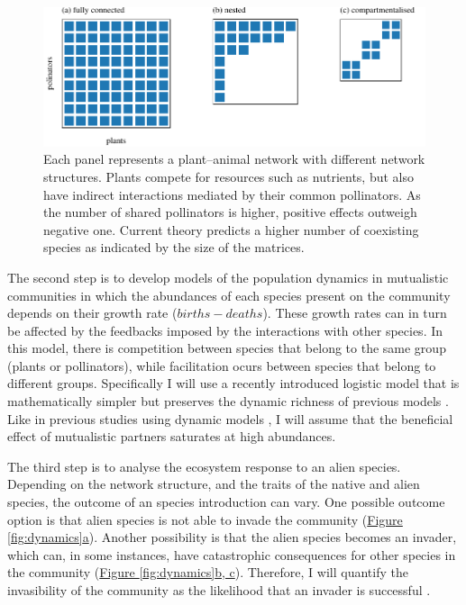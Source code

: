 \documentclass[a4paper]{article}
\begin{document}
\begin{figure}[tbp]
  \includegraphics{networks}
  \caption{
  \label{fig:networks}
  Each panel represents a plant–animal network with different network structures.
  Plants compete for resources such as nutrients, but also have indirect interactions mediated by their common pollinators.
  As the number of shared pollinators is higher, positive effects outweigh negative one.
  Current theory predicts a higher number of coexisting species as indicated by the size of the matrices.
  }
\end{figure}

The second step is to develop models of the population dynamics in mutualistic communities in which the abundances of each species present on the community depends on their growth rate ($births - deaths$).
These growth rates can in turn be affected by the feedbacks imposed by the interactions with other species.
In this model, there is competition between species that belong to the same group (plants or pollinators), while facilitation ocurs between species that belong to different groups.
Specifically I will use a recently introduced logistic model that is mathematically simpler but preserves the dynamic richness of previous models \autocite{Garcia-Algarra2013}.
Like in previous studies using dynamic models \autocite{Okuyama2008, Bastolla2009}, I will assume that the beneficial effect of mutualistic partners saturates at high abundances.

The third step is to analyse the ecosystem response to an alien species.
Depending on the network structure, and the traits of the native and alien species, the outcome of an species introduction can vary.
One possible outcome option is that alien species is not able to invade the community (\hyperref[fig:dynamics]{Figure \ref{fig:dynamics}a}).
Another possibility is that the alien species becomes an invader, which can, in some instances, have catastrophic consequences for other species in the community (\hyperref[fig:dynamics]{Figure \ref{fig:dynamics}b, c}).
Therefore, I will quantify the invasibility of the community as the likelihood that an invader is successful \autocite{Ives2007, Romanuk2009}.
\end{document}

